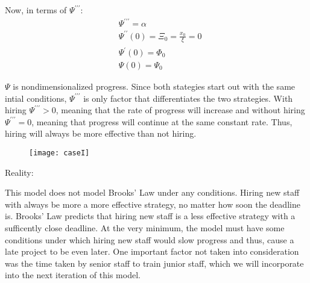\documentclass{article}
\newenvironment{atomize}
    {\begin{list} {} {
            \setlength\itemindent{0pt}
            \setlength\leftmargin{10pt}
            \setlength\labelwidth{0pt}
    }}
    {\end{list}}
\begin{document}
\begin{atomize}
\begin{atomize}
        \item Now, in terms of $\Psi^{\prime\prime\prime}$:
          \begin{align*}
            &\Psi^{\prime\prime\prime} = \alpha \\[6pt]
            &\Psi^{\prime\prime}(0) = \Xi_{0} = \frac{x_{0}}{\xi} = 0 \\[6pt]
            &\Psi^{\prime}(0) = \Phi_{0} \\[6pt]
            &\Psi(0) = \Psi_{0}
          \end{align*}

        \item $\Psi$ is nondimensionalized progress. Since both stategies start
        out with the same intial conditions, $\Psi^{\prime\prime\prime}$ is only
        factor that differentiates the two strategies.  With hiring
        $\Psi^{\prime\prime\prime} > 0$, meaning that the rate of progress will
        increase and without hiring $\Psi^{\prime\prime\prime} = 0$, meaning
        that progress will continue at the same constant rate. Thus, hiring will
        always be more effective than not hiring. 
        \item 
          \begin{figure}[H]
            \centering
            \texttt{[image: caseI]}
          \end{figure}
      \end{atomize}

    \item Reality:
      \begin{atomize}
        \item This model does not model Brooks' Law under any conditions.
        Hiring new staff with always be more a more effective strategy, no
        matter how soon the deadline is. Brooks' Law predicts that hiring
        new staff is a less effective strategy with a sufficently close
        deadline.  At the very minimum, the model must have some conditions
        under which hiring new staff would slow progress and thus, cause a
        late project to be even later. One important factor not taken into
        consideration was the time taken by senior staff to train junior
        staff, which we will incorporate into the next iteration of this
        model.
      \end{atomize}
  \end{atomize}
\end{document}
